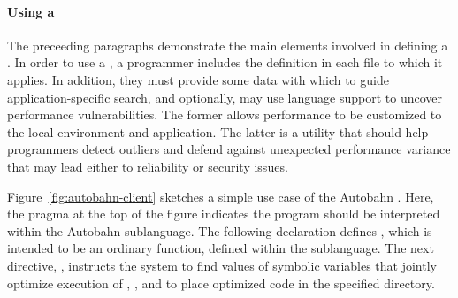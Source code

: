 \paragraph*{Using a \rasp{}}
The preceeding paragraphs demonstrate the main elements involved in
defining a \rasp.  In order to use a \rasp, a programmer includes
the \rasp{} definition in each file to which it applies.  In addition, they
must provide some data with which to guide application-specific search,
and optionally, may use language support to uncover performance vulnerabilities.
The former allows performance to be customized to the local environment and application.
The latter is a utility that should help programmers detect outliers and defend against
unexpected performance variance that may lead either to reliability or security issues.

Figure~\ref{fig:autobahn-client} sketches a simple use case of the Autobahn \rasp.
Here, the pragma at the top of the figure indicates the program should be interpreted
within the Autobahn sublanguage.  The following declaration defines ,
which is intended to be an ordinary function, defined within the \rasp{} sublanguage.
The next directive, , instructs the system to find values of symbolic
variables that jointly optimize execution of , , \etc{}
and to place optimized code in the specified directory.

